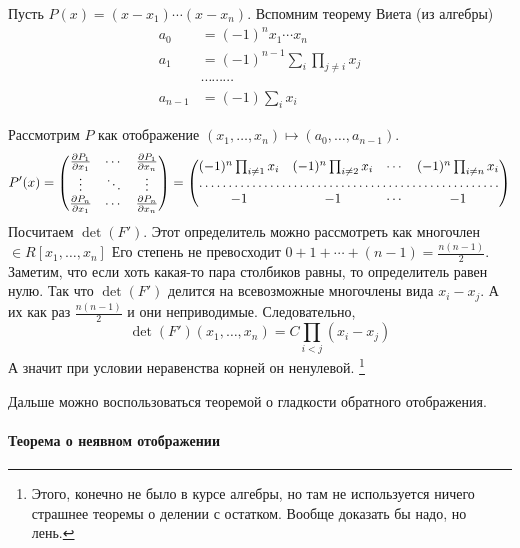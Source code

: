 \documentclass[12pt,trimbord]{../../../notes}
\begin{document}
\begin{ittproof}
  Пусть $P(x) = (x - x_1) \dotsm (x - x_n)$. Вспомним теорему Виета (из алгебры)
  \begin{align*}
    a_0     & = (-1)^n x_1 \dotsm x_n \\
    a_1     & = (-1)^{n-1} \sum_{i} \prod_{j \neq i} x_j \\
            & \cdots \cdots \cdots  \\
    a_{n-1} & = (-1) \sum_i x_i
  \end{align*}

  Рассмотрим $P$ как отображение $(x_1, \dotsc, x_n) \mapsto (a_0, \dotsc, a_{n-1})$.
  \[
    P'(x) = 
    \begin{pmatrix}
      \frac{\partial P_1}{\partial x_1} & \cdots & \frac{\partial P_1}{\partial x_n} \\
      \vdots & \ddots & \vdots \\
      \frac{\partial P_n}{\partial x_1} & \cdots & \frac{\partial P_n}{\partial x_n} \\
    \end{pmatrix}
    = 
    \begin{pmatrix}
      (-1)^n \prod_{i\neq 1} x_i & (-1)^n \prod_{i\neq 2} x_i & \cdots & (-1)^n \prod_{i\neq n} x_i \\
      \hdotsfor{4} \\
      -1 & -1 & \cdots & -1 
    \end{pmatrix}
  \]
  Посчитаем $\det(F')$. Этот определитель можно рассмотреть как многочлен $\in R[x_1, \dotsc, x_n]$
  Его степень не превосходит $0 + 1 + \dotsb + (n-1) = \frac{n(n-1)}{2}$. Заметим, что если хоть
  какая-то пара столбиков равны, то определитель равен нулю. Так что $\det(F')$ делится на
  всевозможные многочлены вида $x_i - x_j$. А их как раз $\frac{n(n-1)}{2}$ и они неприводимые.
  Следовательно, 
  \[
    \det (F')(x_1, \dotsc, x_n) = C \prod_{i<j} (x_i - x_j) 
  \]
  А значит при условии неравенства корней он ненулевой.
  \footnote{Этого, конечно не было в курсе алгебры, но там не используется ничего страшнее
  теоремы о делении с остатком. Вообще доказать бы надо, но лень.}

  Дальше можно воспользоваться теоремой о гладкости обратного отображения.
\end{ittproof}

\paragraph{Теорема о неявном отображении}
\label{par:diffspace::implicit}
\end{document}
